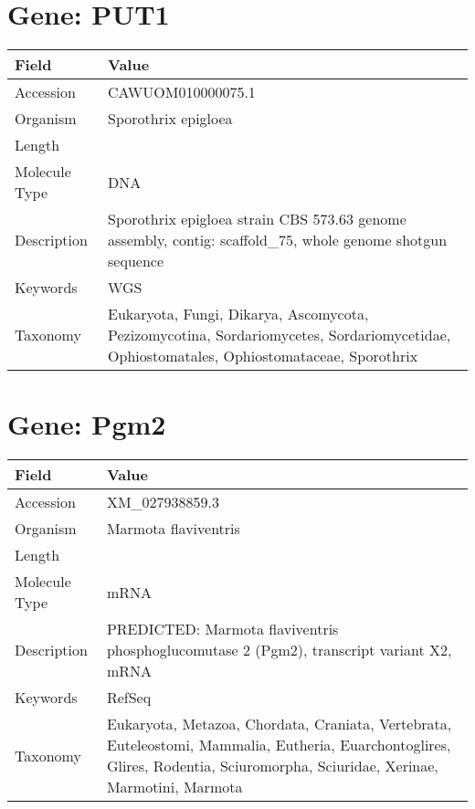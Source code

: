 \documentclass[10pt]{article}
\begin{document}
\section{Gene: PUT1}
{\footnotesize
\begin{longtable}{>{\raggedright\arraybackslash}p{4.5cm} >{\raggedright\arraybackslash}p{11.5cm}}
\textbf{Field} & \textbf{Value} \\
\hline
Accession & CAWUOM010000075.1 \\
Organism & Sporothrix epigloea \\
Length & 114238 \\
Molecule Type & DNA \\
Description & Sporothrix epigloea strain CBS 573.63 genome assembly, contig: scaffold\_75, whole genome shotgun sequence \\
Keywords & WGS \\
Taxonomy & Eukaryota, Fungi, Dikarya, Ascomycota, Pezizomycotina, Sordariomycetes, Sordariomycetidae, Ophiostomatales, Ophiostomataceae, Sporothrix \\
\end{longtable}
}

\vspace{1em}
\section{Gene: Pgm2}
{\footnotesize
\begin{longtable}{>{\raggedright\arraybackslash}p{4.5cm} >{\raggedright\arraybackslash}p{11.5cm}}
\textbf{Field} & \textbf{Value} \\
\hline
Accession & XM\_027938859.3 \\
Organism & Marmota flaviventris \\
Length & 2307 \\
Molecule Type & mRNA \\
Description & PREDICTED: Marmota flaviventris phosphoglucomutase 2 (Pgm2), transcript variant X2, mRNA \\
Keywords & RefSeq \\
Taxonomy & Eukaryota, Metazoa, Chordata, Craniata, Vertebrata, Euteleostomi, Mammalia, Eutheria, Euarchontoglires, Glires, Rodentia, Sciuromorpha, Sciuridae, Xerinae, Marmotini, Marmota \\
\end{longtable}
}
\end{document}

